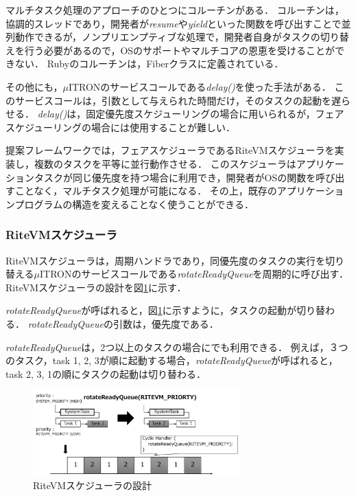 \documentclass[submit,techrep]{ipsj}
\begin{document}
マルチタスク処理のアプローチのひとつにコルーチンがある．
コルーチンは，協調的スレッドであり，開発者が{\it resume}や{\it yield}といった関数を呼び出すことで並列動作できるが，ノンプリエンプティブな処理で，開発者自身がタスクの切り替えを行う必要があるので，OSのサポートやマルチコアの恩恵を受けることができない．
Rubyのコルーチンは，Fiberクラス\cite{url:co-routine}に定義されている．

その他にも，$\mu$ITRONのサービスコールである{\it delay()}を使った手法がある．
このサービスコールは，引数として与えられた時間だけ，そのタスクの起動を遅らせる．
{\it delay()}は，固定優先度スケジューリングの場合に用いられるが，フェアスケジューリングの場合には使用することが難しい．

提案フレームワークでは，フェアスケジューラであるRiteVMスケジューラを実装し，複数のタスクを平等に並行動作させる．
このスケジューラはアプリケーションタスクが同じ優先度を持つ場合に利用でき，開発者がOSの関数を呼び出すことなく，マルチタスク処理が可能になる．
その上，既存のアプリケーションプログラムの構造を変えることなく使うことができる． 

\subsubsection{RiteVMスケジューラ}
RiteVMスケジューラは，周期ハンドラであり，同優先度のタスクの実行を切り替える$\mu$ITRONのサービスコールである{\it rotateReadyQueue}を周期的に呼び出す．
RiteVMスケジューラの設計を図\ref{fig:rotateReadyQueue}に示す．


{\it rotateReadyQueue}が呼ばれると，図\ref{fig:rotateReadyQueue}に示すように，タスクの起動が切り替わる．
{\it rotateReadyQueue}の引数は，優先度である．

{\it rotateReadyQueue}は，2つ以上のタスクの場合にでも利用できる．
例えば，３つのタスク，task 1, 2, 3が順に起動する場合，{\it rotateReadyQueue}が呼ばれると，task 2, 3, 1の順にタスクの起動は切り替わる．

\begin{figure}[t]
    \centering
    \includegraphics[width=8cm,clip]{../EMSOFT2016/figure/rotateReadyQueue.pdf}
    \caption{RiteVMスケジューラの設計}
\vspace{-2mm}
    \label{fig:rotateReadyQueue}
\end{figure} 
 
\end{document}
